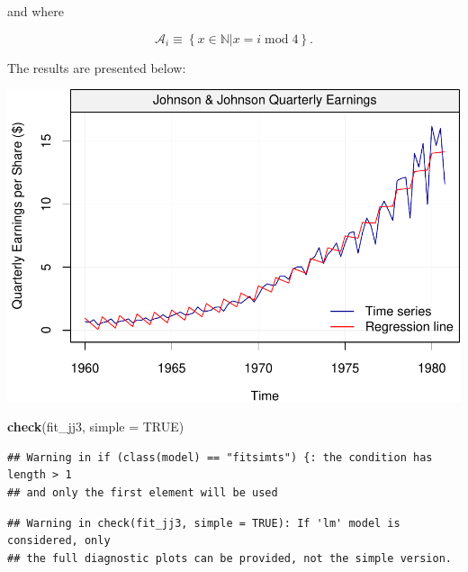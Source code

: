 \documentclass[]{book}
\newenvironment{Shaded}{\begin{snugshade}}{\end{snugshade}}
\newcommand{\KeywordTok}[1]{\textcolor[rgb]{0.13,0.29,0.53}{\textbf{#1}}}
\newcommand{\DataTypeTok}[1]{\textcolor[rgb]{0.13,0.29,0.53}{#1}}
\newcommand{\OtherTok}[1]{\textcolor[rgb]{0.56,0.35,0.01}{#1}}
\newcommand{\NormalTok}[1]{#1}
\theoremstyle{definition}
\theoremstyle{definition}
\theoremstyle{definition}
\theoremstyle{remark}
\begin{document}
and where

\[
\mathcal{A}_i \equiv \left\{x \in \mathbb{N} | x = i \; \text{mod} \;  4\right\}.
\]

The results are presented below:

\begin{center}\includegraphics{ts_files/figure-latex/unnamed-chunk-17-1} \end{center}

\begin{Shaded}
\begin{Highlighting}[]
\KeywordTok{check}\NormalTok{(fit_jj3, }\DataTypeTok{simple =} \OtherTok{TRUE}\NormalTok{)}
\end{Highlighting}
\end{Shaded}

\begin{verbatim}
## Warning in if (class(model) == "fitsimts") {: the condition has length > 1
## and only the first element will be used
\end{verbatim}

\begin{verbatim}
## Warning in check(fit_jj3, simple = TRUE): If 'lm' model is considered, only
## the full diagnostic plots can be provided, not the simple version.
\end{verbatim}
\end{document}
